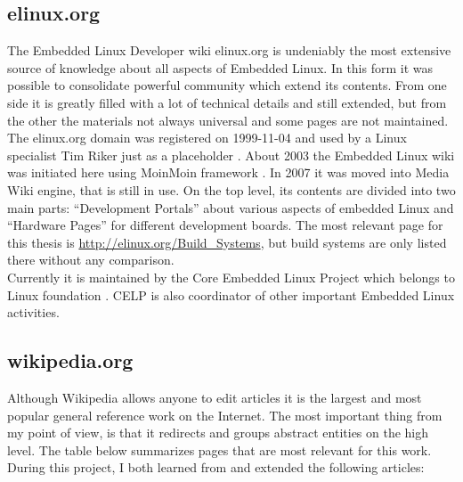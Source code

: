 \documentclass[printmode]{mgr}
\begin{document}
\subsection{elinux.org}

The Embedded Linux Developer wiki elinux.org is undeniably the most extensive source of knowledge about all aspects of Embedded Linux.
In this form it was possible to consolidate powerful community which extend its contents.
From one side it is greatly filled with a lot of technical details and still extended, but from the other the materials not always universal and some pages are not maintained.\\

The elinux.org domain was registered on 1999-11-04 \cite{web:whois-elinux} and used by a Linux specialist Tim Riker just as a placeholder \cite{web:riker} \cite{web:elinux-placeholder}.
About 2003 the Embedded Linux wiki was initiated here using MoinMoin framework \cite{web:elinux-moinmoin}.
In 2007 it was moved into Media Wiki engine, that is still in use.
On the top level, its contents are divided into two main parts: ``Development Portals'' about various aspects of embedded Linux and ``Hardware Pages'' for different development boards.
The most relevant page for this thesis is \url{http://elinux.org/Build_Systems}, but build systems are only listed there without any comparison.\\

Currently it is maintained by the Core Embedded Linux Project which belongs to Linux foundation \cite{web:linuxfoundation-celp}.
CELP is also coordinator of other important Embedded Linux activities.

\subsection{wikipedia.org}

Although Wikipedia allows anyone to edit articles it is the largest and most popular general reference work on the Internet.
The most important thing from my point of view, is that it redirects and groups abstract entities on the high level.
The table below summarizes pages that are most relevant for this work.
During this project, I both learned from and extended the following articles:
\end{document}
